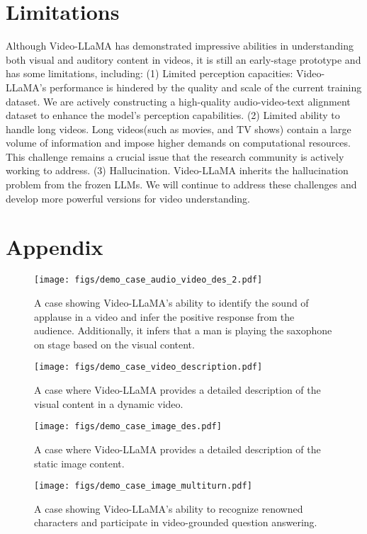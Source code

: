 \documentclass[11pt]{article}
\begin{document}
\section{Limitations}
Although Video-LLaMA has demonstrated impressive abilities in understanding both visual and auditory content in videos, it is still an early-stage prototype and has some limitations, including:
(1) Limited perception capacities: Video-LLaMA's performance is hindered by the quality and scale of the current training dataset. We are actively constructing a high-quality audio-video-text alignment dataset to enhance the model's perception capabilities. 
(2) Limited ability to handle long videos. Long videos(such as movies, and TV shows) contain a large volume of information and impose higher demands on computational resources. This challenge remains a crucial issue that the research community is actively working to address.
(3) Hallucination. Video-LLaMA inherits the hallucination problem from the frozen LLMs. We will continue to address these challenges and develop more powerful versions for video understanding.


\clearpage



\appendix

\section{Appendix}
\label{sec:appendix}




\begin{figure*}[ht]
    \centering
    \texttt{[image: figs/demo\_case\_audio\_video\_des\_2.pdf]}
    \caption{A case showing Video-LLaMA's ability to identify the sound of applause in a video and infer the positive response from the audience. Additionally, it infers that a man is playing the saxophone on stage based on the visual content.}
    \label{fig.demo_case_audio_video_des_2}
\end{figure*}


\begin{figure*}[ht]
    \centering
    \texttt{[image: figs/demo\_case\_video\_description.pdf]}
    \caption{A case where Video-LLaMA provides a detailed description of the visual content in a dynamic video.}
    \label{fig.demo_case_video_description}
\end{figure*}



\begin{figure*}[ht]
    \centering
    \texttt{[image: figs/demo\_case\_image\_des.pdf]}
    \caption{A case where Video-LLaMA provides a detailed description of the static image content.}
    \label{fig.demo_case_image_des}
\end{figure*}






\begin{figure*}[ht]
    \centering
    \texttt{[image: figs/demo\_case\_image\_multiturn.pdf]}
    \caption{A case showing Video-LLaMA's ability to recognize renowned characters and participate in video-grounded question answering.}
    \label{fig.demo_case_image_multiturn}
\end{figure*}
\end{document}
